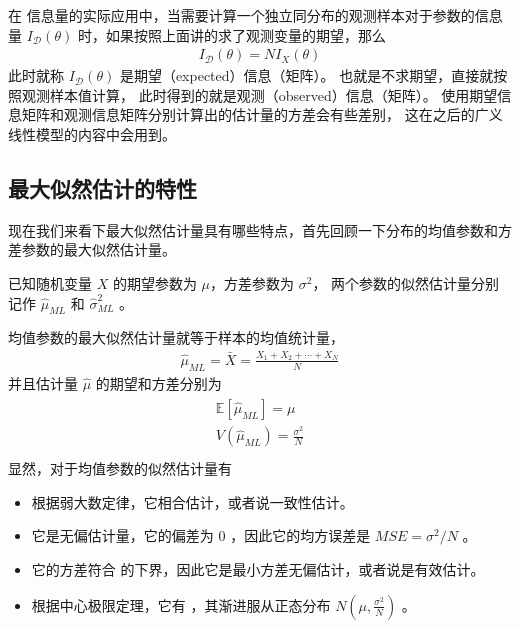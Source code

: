 \documentclass[letterpaper,10pt,english]{sphinxmanual}
\begin{document}
在  信息量的实际应用中，当需要计算一个独立同分布的观测样本对于参数的信息量 \(I_{\mathcal{D}} (\theta)\)
时，如果按照上面讲的求了观测变量的期望，那么
\begin{equation}\label{equation:推断与检验/content:推断与检验/content:63}
\begin{split}I_{\mathcal{D}} (\theta) =  N I_{X} (\theta)\end{split}
\end{equation}
此时就称 \(I_{\mathcal{D}} (\theta)\) 是期望（expected）信息（矩阵）。
也就是不求期望，直接就按照观测样本值计算，
此时得到的就是观测（observed）信息（矩阵）。
使用期望信息矩阵和观测信息矩阵分别计算出的估计量的方差会有些差别，
这在之后的广义线性模型的内容中会用到。


\subsection{最大似然估计的特性}
\label{\detokenize{_u63a8_u65ad_u4e0e_u68c0_u9a8c/content:ch-2-mle-estimator}}\label{\detokenize{_u63a8_u65ad_u4e0e_u68c0_u9a8c/content:id15}}
现在我们来看下最大似然估计量具有哪些特点，首先回顾一下分布的均值参数和方差参数的最大似然估计量。

已知随机变量 \(X\) 的期望参数为 \(\mu\)，方差参数为 \(\sigma^2\)，
两个参数的似然估计量分别记作 \(\hat{\mu}_{ML}\) 和 \(\hat{\sigma}^2_{ML}\)
。


均值参数的最大似然估计量就等于样本的均值统计量，
\begin{equation}\label{equation:推断与检验/content:推断与检验/content:64}
\begin{split}\hat{\mu}_{ML} = \bar{X} = \frac{X_1+X_2+\cdots+X_N}{N}\end{split}
\end{equation}
并且估计量 \(\hat{\mu}\) 的期望和方差分别为
\begin{align}\label{equation:推断与检验/content:推断与检验/content:65}\!\begin{aligned}
\mathbb{E}[\hat{\mu}_{ML}] = \mu\\
V(\hat{\mu}_{ML}) = \frac{\sigma^2}{N}\\
\end{aligned}\end{align}
显然，对于均值参数的似然估计量有
\begin{itemize}
\item {} 
根据弱大数定律，它相合估计，或者说一致性估计。

\item {} 
它是无偏估计量，它的偏差为 \(0\) ，因此它的均方误差是 \(MSE=\sigma^2/N\) 。

\item {} 
它的方差符合  的下界，因此它是最小方差无偏估计，或者说是有效估计。

\item {} 
根据中心极限定理，它有  ，其渐进服从正态分布 \(N(\mu,\frac{\sigma^2}{N})\) 。

\end{itemize}
\end{document}
